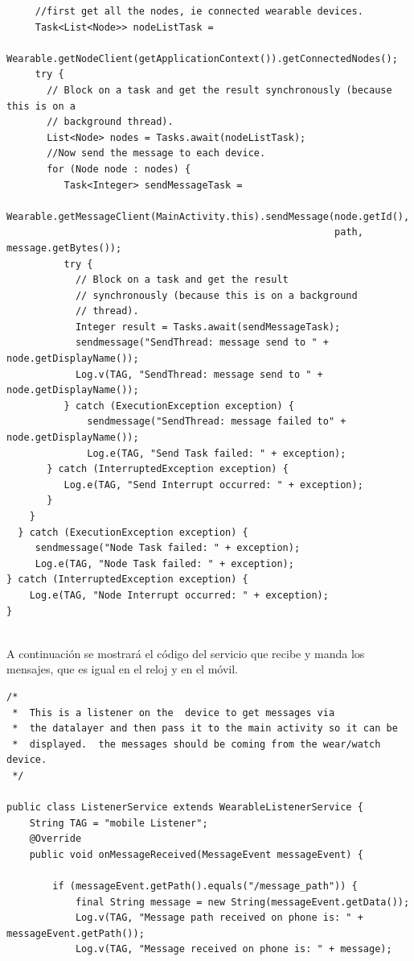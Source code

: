 \documentclass[12pt]{book}
\numberwithin{equation}{section}
\begin{document}
\begin{appendices}
\begin{verbatim}
     //first get all the nodes, ie connected wearable devices.
     Task<List<Node>> nodeListTask =
     Wearable.getNodeClient(getApplicationContext()).getConnectedNodes();
     try {
       // Block on a task and get the result synchronously (because this is on a 	
       // background thread).
       List<Node> nodes = Tasks.await(nodeListTask);
       //Now send the message to each device.
       for (Node node : nodes) {
          Task<Integer> sendMessageTask =
          Wearable.getMessageClient(MainActivity.this).sendMessage(node.getId(),
          												 path, message.getBytes());
          try {
            // Block on a task and get the result
            // synchronously (because this is on a background
            // thread).
            Integer result = Tasks.await(sendMessageTask);
            sendmessage("SendThread: message send to " + node.getDisplayName());
            Log.v(TAG, "SendThread: message send to " + node.getDisplayName());
          } catch (ExecutionException exception) {
              sendmessage("SendThread: message failed to" + node.getDisplayName());
              Log.e(TAG, "Send Task failed: " + exception);
       } catch (InterruptedException exception) {
          Log.e(TAG, "Send Interrupt occurred: " + exception);
       }
    }
  } catch (ExecutionException exception) {
     sendmessage("Node Task failed: " + exception);
     Log.e(TAG, "Node Task failed: " + exception);
} catch (InterruptedException exception) {
    Log.e(TAG, "Node Interrupt occurred: " + exception);
}


\end{verbatim}

\newpage
A continuación se mostrará el código del servicio que recibe y manda los mensajes, que es igual en el reloj y en el móvil.

\begin{verbatim}
/*
 *  This is a listener on the  device to get messages via
 *  the datalayer and then pass it to the main activity so it can be
 *  displayed.  the messages should be coming from the wear/watch device.
 */

public class ListenerService extends WearableListenerService {
    String TAG = "mobile Listener";
    @Override
    public void onMessageReceived(MessageEvent messageEvent) {

        if (messageEvent.getPath().equals("/message_path")) {
            final String message = new String(messageEvent.getData());
            Log.v(TAG, "Message path received on phone is: " + messageEvent.getPath());
            Log.v(TAG, "Message received on phone is: " + message);


\end{verbatim}
\end{appendices}
\end{document}
